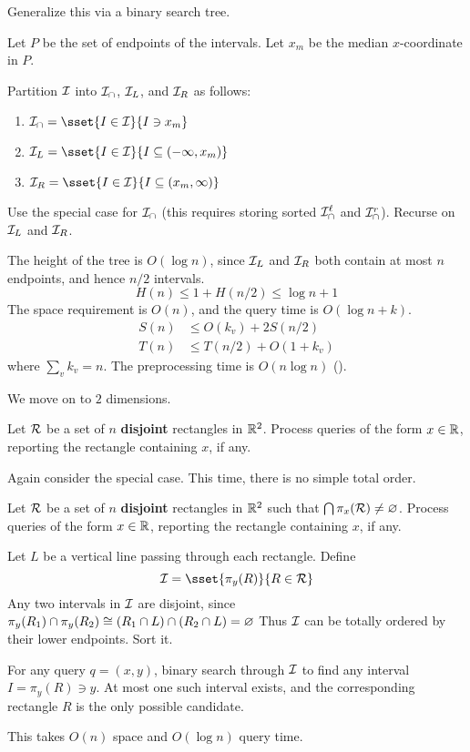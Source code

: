 Generalize this via a binary search tree.
\begin{solution}
    Let $P$ be the set of endpoints of the intervals.
    Let $x_m$ be the median $x$-coordinate in $P$.

    Partition $\mathcal{I}$ into $\mathcal{I}_\cap$, $\mathcal{I}_L$, and $\mathcal{I}_R$
    as follows:
    \begin{enumerate}
        \item $\mcI_\cap = \sset{I \in \mcI}{I \ni x_m}$
        \item $\mcI_L = \sset{I \in \mcI}{I \subseteq (-\infty, x_m)}$
        \item $\mcI_R = \sset{I \in \mcI}{I \subseteq (x_m, \infty)}$
    \end{enumerate}
    Use the special case for $\mathcal{I}_\cap$
    (this requires storing sorted $\mathcal{I}_\cap^\ell$ and $\mathcal{I}_\cap^r$).
    Recurse on $\mathcal{I}_L$ and $\mathcal{I}_R$.

    The height of the tree is $O(\log n)$, since $\mathcal{I}_L$ and $\mathcal{I}_R$
    both contain at most $n$ endpoints, and hence $n/2$ intervals.
    \[
        H(n) \le 1 + H(n/2) \le \log n + 1
    \] The space requirement is $O(n)$, and the query time is
    $O(\log n + k)$. \begin{align*}
        S(n) &\le O(k_v) + 2S(n/2) \\
        T(n) &\le T(n/2) + O(1 + k_v)
    \end{align*} where $\sum_v k_v = n$.
    The preprocessing time is $O(n \log n)$ (\TODO[exercise]).
\end{solution}

We move on to $2$ dimensions.
\begin{question*}
    Let $\mathcal{R}$ be a set of $n$ \textbf{disjoint} rectangles in $\mathbb{R}^2$.
    Process queries of the form $x \in \mathbb{R}$, reporting the rectangle
    containing $x$, if any.
\end{question*}

Again consider the special case.
This time, there is no simple total order.
\begin{question*}
    Let $\mathcal{R}$ be a set of $n$ \textbf{disjoint} rectangles in $\mathbb{R}^2$ such
    that $\bigcap \pi_x(\mathcal{R}) \ne \varnothing$.
    Process queries of the form $x \in \mathbb{R}$, reporting the rectangle
    containing $x$, if any.
\end{question*}
\begin{solution}
    Let $L$ be a vertical line passing through each rectangle.
    Define \[
        \mcI = \sset{\pi_y(R)}{R \in \mcR}
    \]
    Any two intervals in $\mathcal{I}$ are disjoint, since
    $\pi_y(R_1) \cap \pi_y(R_2) \cong (R_1 \cap L) \cap (R_2 \cap L) = \varnothing$
    Thus $\mathcal{I}$ can be totally ordered by their lower endpoints.
    Sort it.

    For any query $q = (x, y)$,
    binary search through $\mathcal{I}$ to find any interval $I = \pi_y(R) \ni y$.
    At most one such interval exists, and the corresponding rectangle $R$
    is the only possible candidate.

    This takes $O(n)$ space and $O(\log n)$ query time.
\end{solution}

